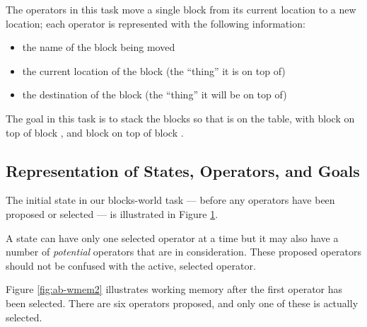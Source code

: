 The operators in this task move a single block from its current location to a
new location; each operator is represented with the following information: 
\vspace{-12pt}
\begin{itemize}
\item the name of the block being moved \vspace{-9pt}
\item the current location of the block (the ``thing'' it is on top of) \vspace{-9pt}
\item the destination of the block (the ``thing'' it will be on top of) 
\vspace{-9pt}
\end{itemize}

The goal in this task is to stack the blocks so that  is on the
table, with block  on top of block , and block  on
top of block .

\subsection{Representation of States, Operators, and Goals}
\label{OVERVIEW-ps-representation}

The initial state in our blocks-world task --- before any operators have been
proposed or selected --- is illustrated in Figure \ref{fig:ab-wmem}.

\begin{figure}
\label{fig:ab-wmem}
\end{figure}

A state can have only one selected operator at a time
but it may also have a number of \emph{potential} operators that are in consideration.
These proposed operators should not be confused with the active, selected operator.

Figure \ref{fig:ab-wmem2} illustrates working memory after the first operator
has been selected. There are six operators proposed, and only one of
these is actually selected.

